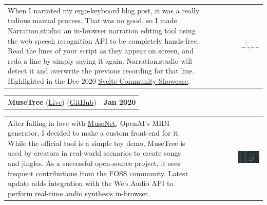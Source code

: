\documentclass[hidelinks, 12pt, a4paper]{article}
\begin{document}
	\hspace{0.05\linewidth}\begin{tabularx}{0.95\linewidth}{Xr}
		\begin{minipage}{\linewidth}
			When I narrated my ergo-keyboard blog post, it was a really tedious manual process.
			That was no good, so I made Narration.studio: an in-browser narration editing tool using the web speech recognition API to be completely hands-free.
			Read the lines of your script as they appear on screen, and redo a line by simply saying it again.
			Narration.studio will detect it and overwrite the previous recording for that line.
			Highlighted in the Dec 2020 \href{https://svelte.dev/blog/whats-new-in-svelte-december-2020}{Svelte Community Showcase}.
		\end{minipage} & \href{https://narration.studio/}{\includegraphics[align=c, width=0.36\textwidth]{narrationstudio}}
	\end{tabularx}
	
	\vspace{24pt}
	
	\begin{tabularx}{\linewidth}{X r}
		\textbf{MuseTree} (\href{https://stevenwaterman.uk/musetree/}{Live}) (\href{https://github.com/stevenwaterman/musetree}{GitHub}) & \textbf{Jan 2020}
	\end{tabularx}\vspace{2pt}
	
	\hspace{0.05\linewidth}\begin{tabularx}{0.95\linewidth}{Xr}
		\begin{minipage}{\linewidth}
			After falling in love with \href{https://openai.com/blog/musenet/}{MuseNet}, OpenAI's MIDI generator, I decided to make a custom front-end for it.
			While the official tool is a simple toy demo, MuseTree is used by creators in real-world scenarios to create songs and jingles.
			As a successful open-source project, it sees frequent contributions from the FOSS community.
			Latest update adds integration with the Web Audio API to perform real-time audio synthesis in-browser.
		\end{minipage} & \href{https://stevenwaterman.uk/musetree/}{\includegraphics[align=c, width=0.36\textwidth]{musetree}}
	\end{tabularx}
\end{document}
